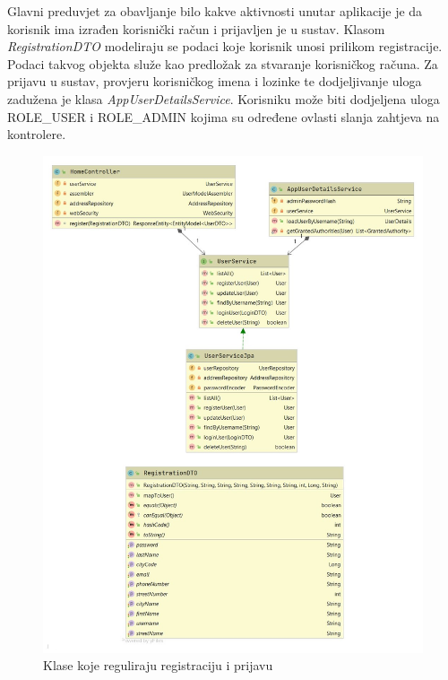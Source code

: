 				\newpage
				
				Glavni preduvjet za obavljanje bilo kakve aktivnosti unutar aplikacije je da korisnik ima izrađen korisnički račun i prijavljen je u sustav. Klasom \textit{RegistrationDTO} modeliraju se podaci koje korisnik unosi prilikom registracije. Podaci takvog objekta služe kao predložak za stvaranje korisničkog računa. Za prijavu u sustav, provjeru korisničkog imena i lozinke te dodjeljivanje uloga zadužena je klasa \textit{AppUserDetailsService}. Korisniku može biti dodjeljena uloga ROLE\_USER i ROLE\_ADMIN kojima su određene ovlasti 
				slanja zahtjeva na kontrolere.
				
				
				\begin{figure}[H]
					\includegraphics[scale=0.45]{slike/cs4.jpg} %
					\centering
					\caption{Klase koje reguliraju registraciju i prijavu}
					
				\end{figure}
			

